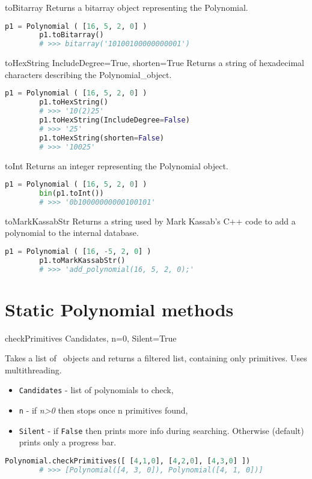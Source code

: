  {toBitarray} {} {
	Returns a bitarray object representing the Polynomial.
}
\begin{lstlisting}[language=Python]
		p1 = Polynomial ( [16, 5, 2, 0] )
		p1.toBitarray()
		# >>> bitarray('10100100000000001')
\end{lstlisting}

 {toHexString} {IncludeDegree=True, shorten=True} {
	Returns a string of hexadecimal characters describing the Polynomial\_object.
}
\begin{lstlisting}[language=Python]
		p1 = Polynomial ( [16, 5, 2, 0] )
		p1.toHexString()
		# >>> '10(2)25'
		p1.toHexString(IncludeDegree=False)
		# >>> '25'
		p1.toHexString(shorten=False)
		# >>> '10025'
\end{lstlisting}

 {toInt} {} {
	Returns an integer representing the Polynomial object.
}
\begin{lstlisting}[language=Python]
		p1 = Polynomial ( [16, 5, 2, 0] )
		bin(p1.toInt())
		# >>> '0b10000000000100101'
\end{lstlisting}

 {toMarkKassabStr} {} {
	Returns a string used by Mark Kassab's C++ code to add a polynomial to the internal database.
}
\begin{lstlisting}[language=Python]
		p1 = Polynomial ( [16, -5, 2, 0] )
		p1.toMarkKassabStr()
		# >>> 'add_polynomial(16, 5, 2, 0);'
\end{lstlisting}

\section{Static Polynomial methods}

 {checkPrimitives} {Candidates, n=0, Silent=True} {
	Takes a list of \Polynomial\ objects and returns a filtered list, containing only primitives. Uses multithreading.
	\begin{itemize}
		\item \texttt{Candidates} - list of polynomials to check,
		\item \texttt{n} - if \textit{n>0} then stops once n primitives found,
		\item \texttt{Silent} - if \texttt{False} then prints more info during searching. Otherwise (default) prints only a progress bar.
	\end{itemize}
}
\begin{lstlisting}[language=Python]
		Polynomial.checkPrimitives([ [4,1,0], [4,2,0], [4,3,0] ])
		# >>> [Polynomial([4, 3, 0]), Polynomial([4, 1, 0])]
\end{lstlisting}

